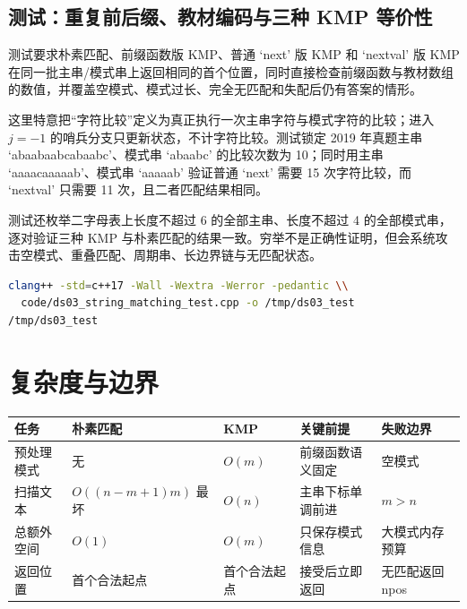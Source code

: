 \documentclass[UTF8,fontset=none,11pt,a4paper]{ctexart}
\begin{document}
\subsection{测试：重复前后缀、教材编码与三种 KMP 等价性}


测试要求朴素匹配、前缀函数版 KMP、普通 `next' 版 KMP 和 `nextval' 版 KMP 在同一批主串/模式串上返回相同的首个位置，同时直接检查前缀函数与教材数组的数值，并覆盖空模式、模式过长、完全无匹配和失配后仍有答案的情形。



这里特意把“字符比较”定义为真正执行一次主串字符与模式字符的比较；进入 $j=-1$ 的哨兵分支只更新状态，不计字符比较。测试锁定 2019 年真题主串 `abaabaabcabaabc'、模式串 `abaabc' 的比较次数为 10；同时用主串 `aaaacaaaaab'、模式串 `aaaaab' 验证普通 `next' 需要 15 次字符比较，而 `nextval' 只需要 11 次，且二者匹配结果相同。

测试还枚举二字母表上长度不超过 6 的全部主串、长度不超过 4 的全部模式串，逐对验证三种 KMP 与朴素匹配的结果一致。穷举不是正确性证明，但会系统攻击空模式、重叠匹配、周期串、长边界链与无匹配状态。

\begin{lstlisting}[language=bash]
clang++ -std=c++17 -Wall -Wextra -Werror -pedantic \\
  code/ds03_string_matching_test.cpp -o /tmp/ds03_test
/tmp/ds03_test
\end{lstlisting}

\section{复杂度与边界}
\begin{center}\small
\begin{tabularx}{\linewidth}{L{2.5cm}C{1.8cm}C{1.8cm}YY}
\toprule
任务 & 朴素匹配 & KMP & 关键前提 & 失败边界\\
\midrule
预处理模式 & 无 & $O(m)$ & 前缀函数语义固定 & 空模式\\
扫描文本 & $O((n-m+1)m)$ 最坏 & $O(n)$ & 主串下标单调前进 & $m>n$\\
总额外空间 & $O(1)$ & $O(m)$ & 只保存模式信息 & 大模式内存预算\\
返回位置 & 首个合法起点 & 首个合法起点 & 接受后立即返回 & 无匹配返回 npos\\
\bottomrule
\end{tabularx}
\end{center}
\end{document}
